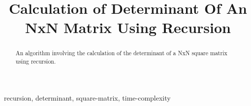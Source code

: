 \documentclass[conference]{IEEEtran}
\begin{document}
\author{
\and
{}
\and
{}
\and
{}
\and
{}
}

\title{Calculation of Determinant Of An NxN Matrix Using Recursion}
\maketitle
\begin{abstract}
An algorithm involving the calculation of the determinant of a NxN square matrix using recursion. 
\end{abstract}

\begin{IEEEkeywords}
recursion, determinant, square-matrix, time-complexity\end{IEEEkeywords}
\end{document}
